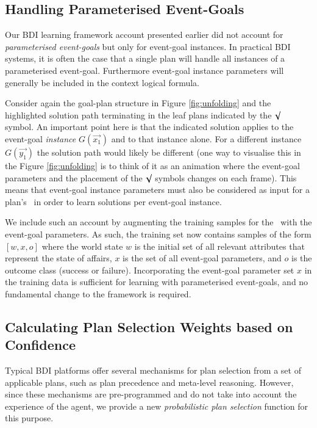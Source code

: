 \subsection{Handling Parameterised Event-Goals}

Our BDI learning framework account presented earlier \cite{Airiau:IJAT:09,Singh:AAMAS10} did not account for \textit{parameterised event-goals} but only for event-goal instances. In practical BDI systems, it is often the case that a single plan will handle all instances of a parameterised event-goal. Furthermore event-goal instance parameters will generally be included in the context logical formula. 

Consider again the goal-plan structure in Figure \ref{fig:unfolding} and the highlighted solution path terminating in the leaf plans indicated by the $\surd$ symbol. An important point here is that the indicated solution applies to the event-goal \textit{instance} $G(\vec{x_1})$ and to that instance alone. For a different instance $G(\vec{y_1})$ the solution path would likely be different (one way to visualise this in the Figure \ref{fig:unfolding} is to think of it as an animation where the event-goal parameters and the placement of the $\surd$ symbols changes on each frame).  This means that event-goal instance parameters must also be considered as input for a plan's \dt\ in order to learn solutions per event-goal instance.

We include such an account by augmenting the training samples for the \dt\ with the event-goal parameters. As such, the training set now contains samples of the form $[w,x,o]$ where the world state $w$ is the initial set of all relevant attributes that represent the state of affairs, $x$ is the set of all event-goal parameters, and $o$ is the outcome class (success or failure). Incorporating the event-goal parameter set $x$ in the training data is sufficient for learning with parameterised event-goals, and no fundamental change to the framework is required.

\subsection{Calculating Plan Selection Weights based on Confidence}


Typical BDI platforms offer several mechanisms for plan selection from a set of applicable plans, such as plan precedence and meta-level reasoning. However, since these mechanisms are pre-programmed and do not take into account the experience of the agent, we provide a new \textit{probabilistic plan selection} function for this purpose. 

